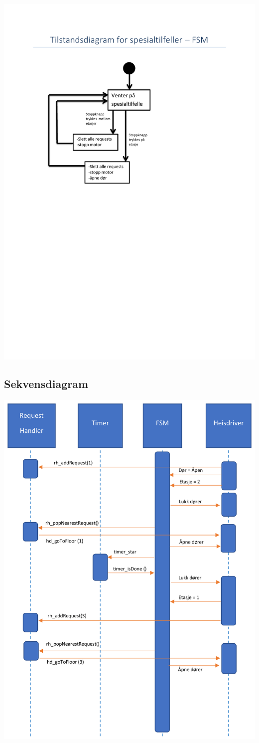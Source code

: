 \documentclass[10pt,a4paper]{article}
\begin{document}
\includegraphics[scale=0.75]{spesialtilfeller_tilstandsdiagram.pdf}
\\
\pagebreak


\subsection{Sekvensdiagram}
\includegraphics[scale=1]{Sekvensdiagram.png}
\end{document}
